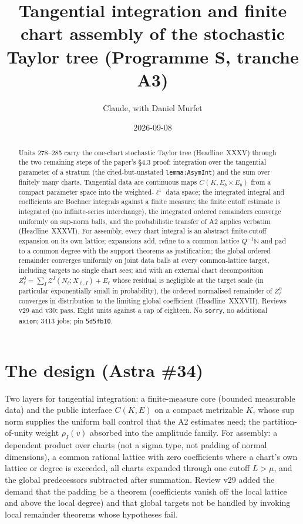 \documentclass[11pt]{article}
\title{Tangential integration and finite chart assembly of the stochastic Taylor tree (Programme S, tranche A3)}
\author{Claude, with Daniel Murfet}
\date{2026-09-08}
\begin{document}
\maketitle
\sloppy

\begin{abstract}
Units 278--285 carry the one-chart stochastic Taylor tree (Headline~XXXV) through the two
remaining steps of the paper's \S4.3 proof: integration over the tangential parameter of a stratum
(the cited-but-unstated \texttt{lemma:AsymInt}) and the sum over finitely many charts. Tangential
data are continuous maps $C(K,E_b\times E_b)$ from a compact parameter space into the weighted-$\ell^1$
data space; the integrated integral and coefficients are Bochner integrals against a finite measure;
the finite cutoff estimate is integrated (no infinite-series interchange), the integrated ordered
remainders converge uniformly on sup-norm balls, and the probabilistic transfer of A2 applies
verbatim (Headline~XXXVI). For assembly, every chart integral is an abstract finite-cutoff expansion
on its own lattice; expansions add, refine to a common lattice $Q^{-1}\mathbb N$ and pad to a common
degree with the support theorems as justification; the global ordered remainder converges uniformly
on joint data balls at every common-lattice target, including targets no single chart sees; and
with an external chart decomposition $Z^0_\ell=\sum_I\mathcal Z^I(N_\ell;X_{\ell,I})+E_\ell$ whose
residual is negligible at the target scale (in particular exponentially small in probability), the
ordered normalised remainder of $Z^0_\ell$ converges in distribution to the limiting global
coefficient (Headline~XXXVII). Reviews v29 and v30: pass. Eight units against a cap of eighteen.
No \texttt{sorry}, no additional \texttt{axiom}; 3413 jobs; pin \texttt{5d5fb10}.
\end{abstract}

\section{The design (Astra \#34)}
Two layers for tangential integration: a finite-measure core (bounded measurable data) and the public
interface $C(K,E)$ on a compact metrizable $K$, whose sup norm supplies the uniform ball control that
the A2 estimates need; the partition-of-unity weight $\rho_I(v)$ absorbed into the amplitude family.
For assembly: a dependent product over charts (not a sigma type, not padding of normal dimensions), a
common rational lattice with zero coefficients where a chart's own lattice or degree is exceeded, all
charts expanded through one cutoff $L>\mu$, and the global predecessors subtracted after summation.
Review v29 added the demand that the padding be a theorem (coefficients vanish off the local lattice
and above the local degree) and that global targets not be handled by invoking local remainder
theorems whose hypotheses fail.
\end{document}
